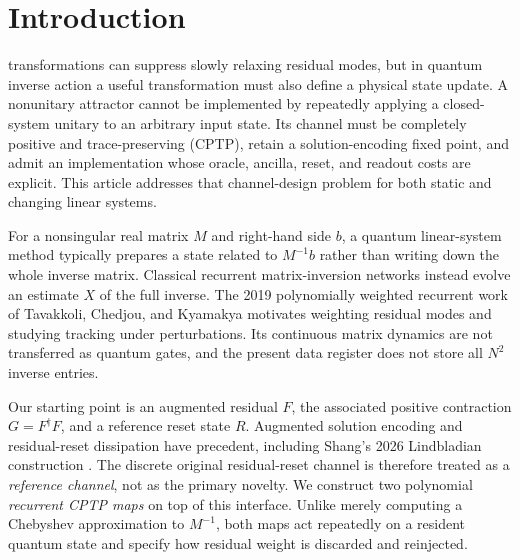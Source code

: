 \documentclass{ieeeaccess}
\begin{document}
\section{Introduction}
 transformations can suppress slowly relaxing residual modes, but in quantum inverse action a useful transformation must also define a physical state update. A nonunitary attractor cannot be implemented by repeatedly applying a closed-system unitary to an arbitrary input state. Its channel must be completely positive and trace-preserving (CPTP), retain a solution-encoding fixed point, and admit an implementation whose oracle, ancilla, reset, and readout costs are explicit. This article addresses that channel-design problem for both static and changing linear systems.

For a nonsingular real matrix $M$ and right-hand side $b$, a quantum linear-system method typically prepares a state related to $M^{-1}b$ rather than writing down the whole inverse matrix. Classical recurrent matrix-inversion networks instead evolve an estimate $X$ of the full inverse. The 2019 polynomially weighted recurrent work of Tavakkoli, Chedjou, and Kyamakya \cite{r4} motivates weighting residual modes and studying tracking under perturbations. Its continuous matrix dynamics are not transferred as quantum gates, and the present data register does not store all $N^2$ inverse entries.

Our starting point is an augmented residual $F$, the associated positive contraction $G=F^\dagger F$, and a reference reset state $R$. Augmented solution encoding and residual-reset dissipation have precedent, including Shang's 2026 Lindbladian construction \cite{shang}. The discrete original residual-reset channel is therefore treated as a \emph{reference channel}, not as the primary novelty. We construct two polynomial \emph{recurrent CPTP maps} on top of this interface. Unlike merely computing a Chebyshev approximation to $M^{-1}$, both maps act repeatedly on a resident quantum state and specify how residual weight is discarded and reinjected.
\end{document}
